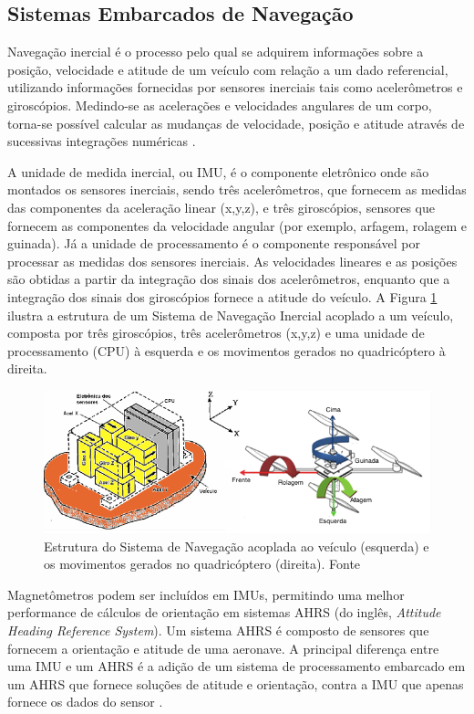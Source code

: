 \documentclass[a4paper, 12pt]{article}
\begin{document}
\subsection{Sistemas Embarcados de Navegação}

Navegação inercial é o processo pelo qual se adquirem informações sobre a posição, velocidade e atitude de um veículo com relação a um dado referencial, utilizando informações fornecidas por sensores inerciais tais como acelerômetros e giroscópios. Medindo-se as acelerações e velocidades angulares de um corpo, torna-se possível calcular as mudanças de velocidade, posição e atitude através de sucessivas integrações numéricas \cite{Adalberto2009}.

A unidade de medida inercial, ou IMU, é o componente eletrônico onde são montados os sensores inerciais, sendo três acelerômetros, que fornecem as medidas das componentes da aceleração linear (x,y,z), e três giroscópios, sensores que fornecem as componentes da velocidade angular (por exemplo, arfagem, rolagem e guinada). Já a unidade de processamento é o componente responsável por processar as medidas dos sensores inerciais. As velocidades lineares e as posições são obtidas a partir da integração dos sinais dos acelerômetros, enquanto que a integração dos sinais dos giroscópios fornece a atitude do veículo.  A Figura \ref{fig:imuStrap} ilustra a estrutura de um Sistema de Navegação Inercial acoplado a um veículo, composta por três giroscópios, três acelerômetros (x,y,z) e uma unidade de processamento (CPU) à esquerda e os movimentos gerados no quadricóptero à direita.

\begin{figure}[h]
	\centering
		\includegraphics[scale=0.6]{img/imuStrap.png}
	\caption{Estrutura do Sistema de Navegação acoplada ao veículo (esquerda) e os movimentos gerados no quadricóptero (direita). Fonte \cite{Adalberto2009}}
	\label{fig:imuStrap}
\end{figure}

Magnetômetros podem ser incluídos em IMUs, permitindo uma melhor performance de cálculos de orientação em sistemas AHRS (do inglês, \textit{Attitude Heading Reference System}). Um sistema AHRS é composto de sensores que fornecem a orientação e atitude de uma aeronave. A principal diferença entre uma IMU e um AHRS é a adição de um sistema de processamento embarcado em um AHRS que fornece soluções de atitude e orientação, contra a IMU que apenas fornece os dados do sensor \cite{Angonese2013}.
\end{document}

